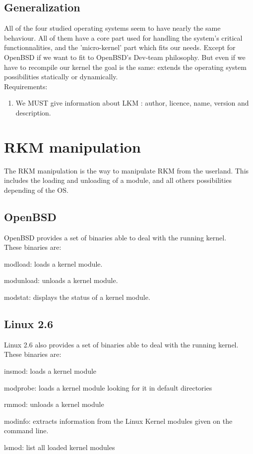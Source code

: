 \documentclass[11pt]{report}
\begin{document}
  \subsection{Generalization}
All of the four studied operating systems seem to have nearly the same behaviour.
All of them have a core part used for handling the system's critical functionnalities,
and the 'micro-kernel' part which fits our needs.
Except for OpenBSD if we want to fit to OpenBSD's Dev-team philosophy. But
even if we have to recompile our kernel the goal is the same: extends the
operating system possibilities statically or dynamically.\\
Requirements:
\begin{enumerate}
	\item We MUST give information about LKM : author, licence, name, version and description.
\end{enumerate}
\newpage
\section{RKM manipulation}
The RKM manipulation is the way to manipulate RKM from the userland. This
includes the loading and unloading of a module, and all others possibilities
depending of the OS.
  \subsection{OpenBSD}
OpenBSD provides a set of binaries able to deal with the running kernel.\\
These binaries are:
    \begin{description}
      \item{modload: loads a kernel module.}
      \item{modunload: unloads a kernel module.}
      \item{modstat: displays the status of a kernel module.}
    \end{description}

  \subsection{Linux 2.6}
Linux 2.6 also provides a set of binaries able to deal with the running kernel.\\
These binaries are:
    \begin{description}
      \item{insmod: loads a kernel module}
      \item{modprobe: loads a kernel module looking for it in default directories}
      \item{rmmod: unloads a kernel module}
      \item{modinfo: extracts information from the Linux Kernel modules
	given on the command line.}
      \item{lsmod: list all loaded kernel modules}
    \end{description}
\end{document}
